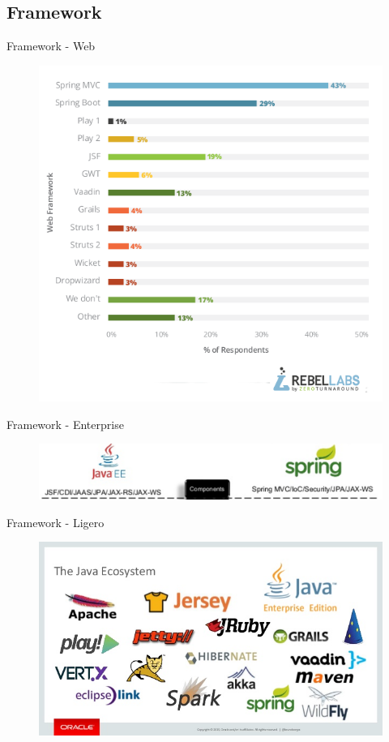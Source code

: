 \documentclass{beamer}
\begin{document}
\subsection{Framework}

\begin{frame}{Framework - Web}
	\begin{figure}
		\centering
		\includegraphics[width=0.9\linewidth]{Images/fwjava}
	\end{figure}
\end{frame}

\begin{frame}{Framework - Enterprise}
	\begin{figure}
		\centering
		\includegraphics[width=\linewidth]{Images/javaeesp}
	\end{figure}
\end{frame}

\begin{frame}{Framework - Ligero}
	\begin{figure}
		\centering
		\includegraphics[width=0.9\linewidth]{Images/ecosystem}
	\end{figure}
\end{frame}
\end{document}

